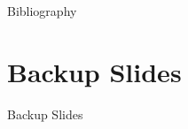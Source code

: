 \documentclass[10pt,aspectratio=169]{beamer}
\begin{document}
\maketitle

\appendix

%   
%   

\begin{frame}[allowframebreaks]{Bibliography}
    \printbibliography[heading=none]
\end{frame}

\section{Backup Slides}

\begin{frame}[label=backup]{Backup Slides}
    \hyperlink{demo}{}
\end{frame}
\end{document}
